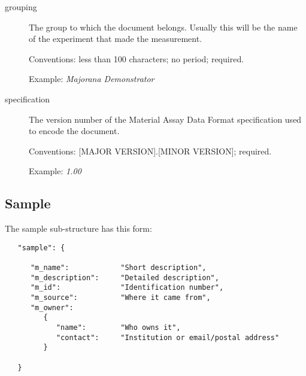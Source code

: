 \documentclass[11pt, letterpaper]{article}
\begin{document}
\begin{description}

  \item[grouping] The group to which the document belongs. Usually this will be the name of the experiment that made the measurement.

  Conventions: less than 100 characters; no period; required.

  Example: \textit{Majorana Demonstrator}

  \item[specification] The version number of the Material Assay Data Format specification used to encode the document.

  Conventions: [MAJOR VERSION].[MINOR VERSION]; required.

  Example: \textit{1.00}

\end{description}  
 
\subsection{Sample} %

The sample sub-structure has this form:

\begin{small}
\begin{verbatim}
   "sample": {

      "m_name":            "Short description",
      "m_description":     "Detailed description",
      "m_id":              "Identification number",
      "m_source":          "Where it came from",
      "m_owner":
         {
            "name":        "Who owns it", 
            "contact":     "Institution or email/postal address"
         }

   }
\end{verbatim}
\end{small}
\end{document}

